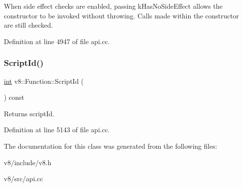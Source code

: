 When side effect checks are enabled, passing k\+Has\+No\+Side\+Effect allows the constructor to be invoked without throwing. Calls made within the constructor are still checked. 

Definition at line 4947 of file api.\+cc.

\mbox{\label{classv8_1_1Function_a5070c2657325ed6ca05ebb932c641438}} 
\subsubsection{\texorpdfstring{Script\+Id()}{ScriptId()}}
{\footnotesize\ttfamily \mbox{\hyperlink{classint}{int}} v8\+::\+Function\+::\+Script\+Id (\begin{DoxyParamCaption}{ }\end{DoxyParamCaption}) const}

Returns script\+Id. 

Definition at line 5143 of file api.\+cc.



The documentation for this class was generated from the following files\+:\begin{DoxyCompactItemize}
\item 
v8/include/v8.\+h\item 
v8/src/api.\+cc\end{DoxyCompactItemize}
